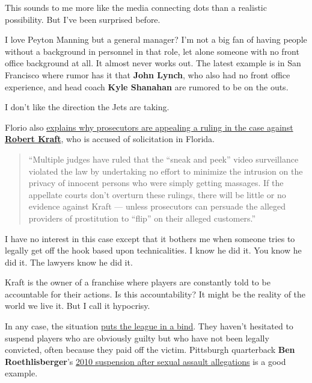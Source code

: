 \documentclass[11pt]{article}
\begin{document}
This sounds to me more like the media connecting dots than a realistic possibility.  But I've been surprised before.

I love Peyton Manning but a general manager?  I'm not a big fan of having people without a background in personnel in that role, let alone someone with no front office background at all. It almost never works out.  The latest example is in San Francisco where rumor has it that \textbf{John Lynch}, who also had no front office experience, and head coach \textbf{Kyle Shanahan} are rumored to be on the outs.

I don’t like the direction the Jets are taking.

\item Florio also \href{https://profootballtalk.nbcsports.com/2019/05/17/prosecution-appeals-suppression-order-in-kraft-case/}{explains why prosecutors are appealing a ruling in the case against \textbf{Robert Kraft}}, who is accused of solicitation in Florida.

\begin{quote}
``Multiple judges have ruled that the “sneak and peek” video surveillance violated the law by undertaking no effort to minimize the intrusion on the privacy of innocent persons who were simply getting massages. If the appellate courts don’t overturn these rulings, there will be little or no evidence against Kraft — unless prosecutors can persuade the alleged providers of prostitution to “flip” on their alleged customers.''
\end{quote}

I have no interest in this case except that it bothers me when someone tries to legally get off the hook based upon technicalities.  I know he did it.  You know he did it.  The lawyers know he did it.

Kraft is the owner of a franchise where players are constantly told to be accountable for their actions.  Is this accountability?  It might be the reality of the world we live it.  But I call it hypocrisy.

In any case, the situation \href{https://profootballtalk.nbcsports.com/2019/05/16/if-robert-kraft-is-exonerated-what-happens-next/}{puts the league in a bind}.  They  haven't hesitated to suspend players who are obviously guilty but who have not been legally convicted, often because they paid off the victim.  Pittsburgh quarterback \textbf{Ben Roethlisberger}'s \href{https://en.wikipedia.org/wiki/Ben_Roethlisberger#Sexual_assault_allegations}{2010 suspension after sexual assault allegations} is a good example.
\end{document}
